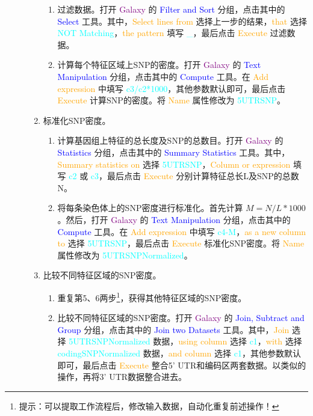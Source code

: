 \begin{description}
\begin{enumerate}
\begin{enumerate}
					\item 过滤数据。打开 \textcolor{purple}{Galaxy} 的 \textcolor{blue}{Filter and Sort} 分组，点击其中的 \textcolor{blue}{Select} 工具。其中，\textcolor{orange}{Select lines from} 选择上一步的结果，\textcolor{orange}{that} 选择 \textcolor{cyan}{NOT Matching}，\textcolor{orange}{the pattern} 填写  \textcolor{cyan}{\_}，最后点击 \textcolor{orange}{Execute} 过滤数据。 
					\item 计算每个特征区域上SNP的密度。打开 \textcolor{purple}{Galaxy} 的 \textcolor{blue}{Text Manipulation} 分组，点击其中的 \textcolor{blue}{Compute} 工具。在 \textcolor{orange}{Add expression} 中填写 \textcolor{cyan}{c3/c2*1000}，其他参数默认即可，最后点击 \textcolor{orange}{Execute} 计算SNP的密度。将 \textcolor{orange}{Name} 属性修改为 \textcolor{cyan}{5UTRSNP}。
				\end{enumerate}
			\item 标准化SNP密度。
				\begin{enumerate}
					\item 计算基因组上特征的总长度及SNP的总数目。打开 \textcolor{purple}{Galaxy} 的 \textcolor{blue}{Statistics} 分组，点击其中的 \textcolor{blue}{Summary Statistics} 工具。其中，\textcolor{orange}{Summary statistics on} 选择 \textcolor{cyan}{5UTRSNP}，\textcolor{orange}{Column or expression} 填写 \textcolor{cyan}{c2} 或 \textcolor{cyan}{c3}，最后点击 \textcolor{orange}{Execute} 分别计算特征总长L及SNP的总数N。
					\item 将每条染色体上的SNP密度进行标准化。首先计算 $M=N/L*1000$ 。然后，打开 \textcolor{purple}{Galaxy} 的 \textcolor{blue}{Text Manipulation} 分组，点击其中的 \textcolor{blue}{Compute} 工具。在 \textcolor{orange}{Add expression} 中填写 \textcolor{cyan}{c4-M}，\textcolor{orange}{as a new column to} 选择 \textcolor{cyan}{5UTRSNP}，最后点击 \textcolor{orange}{Execute} 标准化SNP密度。将 \textcolor{orange}{Name} 属性修改为 \textcolor{cyan}{5UTRSNPNormalized}。
				\end{enumerate}
			\item 比较不同特征区域的SNP密度。
				\begin{enumerate}
					\item 重复第5、6两步\footnote{提示：可以提取工作流程后，修改输入数据，自动化重复前述操作！}，获得其他特征区域的SNP密度。
					\item 比较不同特征区域的SNP密度。打开 \textcolor{purple}{Galaxy} 的 \textcolor{blue}{Join, Subtract and Group} 分组，点击其中的 \textcolor{blue}{Join two Datasets} 工具。其中，\textcolor{orange}{Join} 选择 \textcolor{cyan}{5UTRSNPNormalized} 数据，\textcolor{orange}{using column} 选择 \textcolor{cyan}{c1}，\textcolor{orange}{with} 选择 \textcolor{cyan}{codingSNPNormalized} 数据，\textcolor{orange}{and column} 选择 \textcolor{cyan}{c1}，其他参数默认即可，最后点击 \textcolor{orange}{Execute} 整合5' UTR和编码区两套数据。以类似的操作，再将3' UTR数据整合进去。

\end{enumerate}
\end{enumerate}
\end{description}
